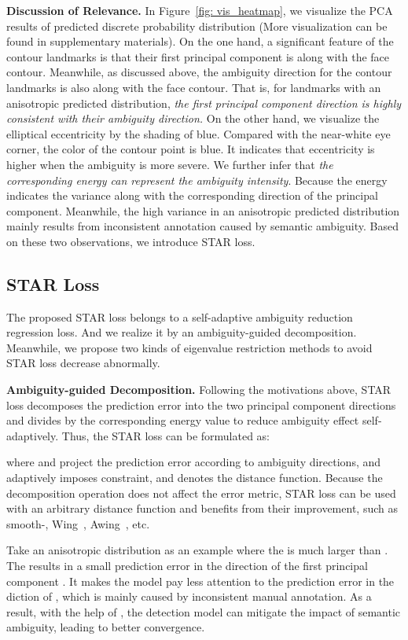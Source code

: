\documentclass[10pt,twocolumn,letterpaper]{article}
\begin{document}
\noindent\textbf{Discussion of Relevance.}
In Figure~\ref{fig: vis_heatmap}, we visualize the PCA results of predicted discrete probability distribution (More visualization can be found in supplementary materials). On the one hand, a significant feature of the contour landmarks is that their first principal component is along with the face contour. 
Meanwhile, as discussed above, the ambiguity direction for the contour landmarks is also along with the face contour. 
That is, for landmarks with an anisotropic predicted distribution, \textit{the first principal component direction is highly consistent with their ambiguity direction.} 
On the other hand, we visualize the elliptical eccentricity  by the shading of blue. 
Compared with the near-white eye corner, the color of the contour point is blue. 
It indicates that eccentricity is higher when the ambiguity is more severe. 
We further infer that \textit{the corresponding energy can represent the ambiguity intensity}. 
Because the energy indicates the variance along with the corresponding direction of the principal component. 
Meanwhile, the high variance in an anisotropic predicted distribution mainly results from inconsistent annotation caused by semantic ambiguity. Based on these two observations, we introduce STAR loss.


\subsection{STAR Loss}
The proposed STAR loss belongs to a self-adaptive ambiguity reduction regression loss.
And we realize it by an ambiguity-guided decomposition.
Meanwhile, we propose two kinds of eigenvalue restriction methods to avoid STAR loss decrease abnormally.


\noindent\textbf{Ambiguity-guided Decomposition.}
Following the motivations above, STAR loss decomposes the prediction error into the two principal component directions and divides by the corresponding energy value to reduce ambiguity effect self-adaptively.
Thus, the STAR loss can be formulated as:

where  and  project the prediction error  according to ambiguity directions,  and  adaptively imposes constraint, and  denotes the distance function.
Because the decomposition operation does not affect the error metric, STAR loss can be used with an arbitrary distance function and benefits from their improvement, such as smooth-, Wing~\cite{feng2018wing}, Awing~\cite{wang2019awing}, etc.


Take an anisotropic distribution as an example where the  is much larger than .
The  results in a small prediction error in the direction of the first principal component .
It makes the model pay less attention to the prediction error in the diction of , which is mainly caused by inconsistent manual annotation.
As a result, with the help of , the detection model can mitigate the impact of semantic ambiguity, leading to better convergence.
\end{document}
